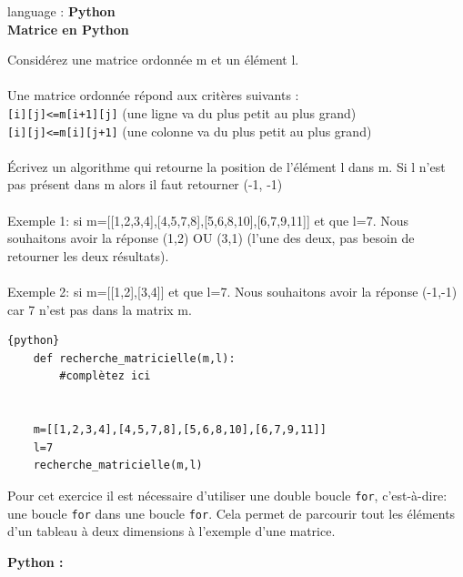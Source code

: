 \begin{Exercice}[10 minutes] language : \textbf{Python}\\
    
    \textbf{Matrice en Python}

    Considérez une matrice ordonnée m et un élément l.\\\\
    
    Une matrice ordonnée répond aux critères suivants :\\
     \lstinline{[i][j]<=m[i+1][j]} (une ligne va du plus petit au plus grand)\\
     \lstinline{[i][j]<=m[i][j+1]} (une colonne va du plus petit au plus grand)\\\\
 
    
    Écrivez un algorithme qui retourne la position de l’élément l dans m. Si l n’est pas présent dans m alors il faut retourner (-1, -1)\\\\
    
    Exemple 1: si m=[[1,2,3,4],[4,5,7,8],[5,6,8,10],[6,7,9,11]] et que l=7. Nous souhaitons avoir la réponse (1,2) OU (3,1) (l’une des deux, pas besoin de retourner les deux résultats).\\\\
    
    Exemple 2: si m=[[1,2],[3,4]] et que l=7. Nous souhaitons avoir la réponse (-1,-1) car 7 n’est pas dans la matrix m.\\


    \begin{lstlisting}{python}
    def recherche_matricielle(m,l):
        #complètez ici
    
    
    m=[[1,2,3,4],[4,5,7,8],[5,6,8,10],[6,7,9,11]]
    l=7
    recherche_matricielle(m,l)
    \end{lstlisting}

    \begin{conseil}
    Pour cet exercice il est nécessaire d'utiliser une double boucle \lstinline{for}, c'est-à-dire: une boucle \lstinline{for} dans une boucle \lstinline{for}. Cela permet de parcourir tout les éléments d'un tableau à deux dimensions à l'exemple d'une matrice. 
    \end{conseil}

    \begin{solution}
        \textbf{Python :}
        
    \end{solution}

\end{Exercice}

